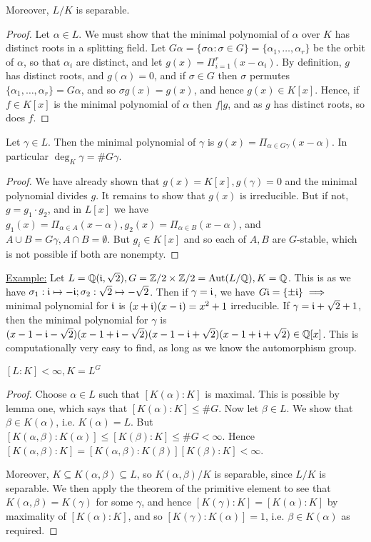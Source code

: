 \documentclass[10pt,a4paper]{article}
\begin{document}
\begin{lemma}
Moreover, $L/K$ is separable.
\end{lemma}
\begin{proof}
Let $\alpha \in L$. We must show that the minimal polynomial of $\alpha$ over $K$ has distinct roots in a splitting field. Let $G\alpha = \{\sigma\alpha : \sigma \in G\} = \{\alpha_1, \ldots, \alpha_r\}$ be the orbit of $\alpha$, so that $\alpha_i$ are distinct, and let $g(x) = \Pi_{i=1}^r (x-\alpha_i).$ By definition, $g$ has distinct roots, and $g(\alpha) = 0$, and if $\sigma \in G$ then $\sigma$ permutes $\{\alpha_1, \ldots, \alpha_r\} = G\alpha$, and so $\sigma g(x) = g(x)$, and hence $g(x) \in K[x]$. Hence, if $f \in K[x]$ is the minimal polynomial of $\alpha$ then $f|g$, and as $g$ has distinct roots, so does $f$.
\end{proof}
\begin{lemma}
Let $\gamma \in L$. Then the minimal polynomial of $\gamma$ is $g(x) = \Pi_{\alpha \in G\gamma} (x-\alpha)$. In particular $\deg_K \gamma = \# G\gamma$.
\end{lemma}
\begin{proof}
We have already shown that $g(x) = K[x], g(\gamma) = 0$ and the minimal polynomial divides $g$. It remains to show that $g(x)$ is irreducible. But if not, $g = g_1 \cdot g_2$, and in $L[x]$ we have $g_1(x) = \Pi_{\alpha \in A} (x-\alpha), g_2(x) = \Pi_{\alpha\in B} (x-\alpha)$, and $A \cup B = G\gamma, A \cap B = \emptyset$. But $g_i \in K[x]$ and so each of $A, B$ are $G$-stable, which is not possible if both are nonempty.
\end{proof}
\underline{Example:} Let $L = \mathbb{Q}(\mathfrak{i}, \sqrt{2}), G = \mathbb{Z}/2 \times \mathbb{Z}/2 = \operatorname{Aut} (L/\mathbb{Q}), K = \mathbb{Q}$. This is as we have $\sigma_1: \mathfrak{i} \mapsto -\mathfrak{i}; \sigma_2: \sqrt{2} \mapsto -\sqrt{2}$. Then if $\gamma= \mathfrak{i}$, we have $G \mathfrak{i} = \{\pm \mathfrak{i}\} \implies$ minimal polynomial for $\mathfrak{i}$ is $(x+\mathfrak{i})(x-\mathfrak{i}) = x^2+1$ irreducible. If $\gamma = \mathfrak{i} + \sqrt{2} + 1$, then the minimal polynomial for $\gamma$ is $(x-1-\mathfrak{i}-\sqrt{2})(x-1+\mathfrak{i}-\sqrt{2})(x-1-\mathfrak{i}+\sqrt{2})(x-1+\mathfrak{i}+\sqrt{2}) \in \mathbb{Q}[x]$. This is computationally very easy to find, as long as we know the automorphism group.
\begin{lemma}
$[L:K] <\infty, K = L^G$
\end{lemma}
\begin{proof}
Choose $\alpha \in L$ such that $[K(\alpha):K]$ is maximal. This is possible by lemma one, which says that $[K(\alpha):K] \leq \#G$. Now let $\beta \in L$. We show that $\beta \in K(\alpha)$, i.e. $K(\alpha) = L$. But $[K(\alpha,\beta):K(\alpha)] \leq [K(\beta):K] \leq \#G <\infty$. Hence $[K(\alpha,\beta):K] = [K(\alpha,\beta):K(\beta)][K(\beta):K] <\infty$.

Moreover, $K \subseteq K(\alpha,\beta) \subseteq L$, so $K(\alpha, \beta)/K$ is separable, since $L/K$ is separable. We then apply the theorem of the primitive element to see that $K(\alpha, \beta) = K(\gamma)$ for some $\gamma$, and hence $[K(\gamma):K] = [K(\alpha):K]$ by maximality of $[K(\alpha):K]$, and so $[K(\gamma):K(\alpha)] = 1$, i.e. $\beta \in K(\alpha)$ as required.
\end{proof}
\end{document}

